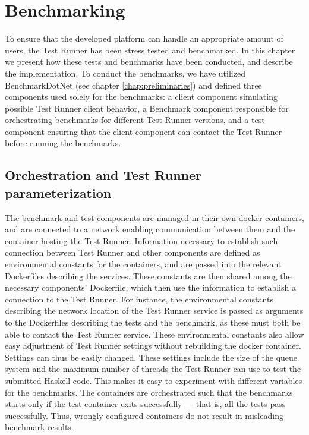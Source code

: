 \chapter{Benchmarking} \label{chap:Benchmarking}
To ensure that the developed platform can handle an appropriate amount of users, the Test Runner has been stress tested and benchmarked.
In this chapter we present how these tests and benchmarks have been conducted, and describe the implementation. To conduct the benchmarks, we have utilized BenchmarkDotNet (see chapter \ref{chap:preliminaries}) and defined three components used solely for the benchmarks:
a client component simulating possible Test Runner client behavior, a Benchmark component responsible for orchestrating benchmarks for different Test Runner versions, and a test component ensuring that the client component can contact the Test Runner before running the benchmarks.

\section{Orchestration and Test Runner parameterization}
The benchmark and test components are managed in their own docker containers, and are connected to a network enabling communication between them and the container hosting the Test Runner. 
Information necessary to establish such connection between Test Runner and other components are defined as environmental constants for the containers, and are passed into the relevant Dockerfiles describing the services.
These constants are then shared among the necessary components' Dockerfile, which then use the information to establish a connection to the Test Runner.
For instance, the environmental constants describing the network location of the Test Runner service is passed as arguments to the Dockerfiles describing the tests and the benchmark, as these must both be able to contact the Test Runner service.
These environmental constants also allow easy adjustment of Test Runner settings without rebuilding the docker container.
Settings can thus be easily changed.
These settings include the size of the queue system and the maximum number of threads the Test Runner can use to test the submitted Haskell code.
This makes it easy to experiment with different variables for the benchmarks.  
The containers are orchestrated such that the benchmarks starts only if the test container exits successfully --- that is, all the tests pass successfully. 
Thus, wrongly configured containers do not result in misleading benchmark results.

